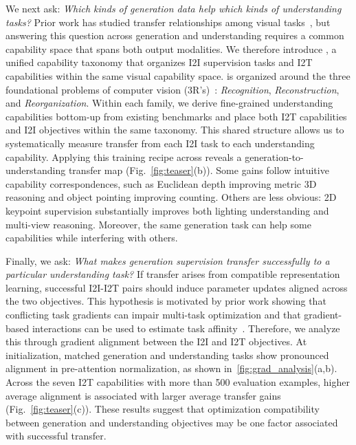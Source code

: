 We next ask: \emph{Which kinds of generation data help which kinds of understanding tasks?}
Prior work has studied transfer relationships among visual tasks~\citep{zamir2018taskonomy},
but answering this question across generation and understanding requires a common capability space that spans both output modalities.
We therefore introduce \methodname, a unified capability taxonomy that organizes I2I supervision tasks and I2T capabilities within the same visual capability space.
\methodname is organized around the three foundational problems of computer vision (3R's)~\citep{malik2016three}: \textit{Recognition}, \textit{Reconstruction}, and \textit{Reorganization}.
Within each family, we derive fine-grained understanding capabilities bottom-up from existing benchmarks and place both I2T capabilities and I2I objectives within the same taxonomy.
This shared structure allows us to systematically measure transfer from each I2I task to each understanding capability.
Applying this training recipe across \methodname reveals a generation-to-understanding transfer map (Fig.~\ref{fig:teaser}(b)).
Some gains follow intuitive capability correspondences, such as Euclidean depth improving metric 3D reasoning and object pointing improving counting.
Others are less obvious: 2D keypoint supervision substantially improves both lighting understanding and multi-view reasoning.
Moreover, the same generation task can help some capabilities while interfering with others.

Finally, we ask: \emph{What makes generation supervision transfer successfully to a particular understanding task?}
If transfer arises from compatible representation learning, successful
I2I-I2T pairs should induce parameter updates aligned across the two objectives.
This hypothesis is motivated by prior work showing that conflicting task gradients
can impair multi-task optimization and that gradient-based interactions can be
used to estimate task affinity~\citep{yu2020gradient,fifty2021efficient}.
Therefore, we analyze this through gradient alignment between the I2I and I2T objectives.
At initialization, matched generation and understanding tasks show pronounced alignment in pre-attention normalization, as shown in~\autoref{fig:grad_analysis}(a,b). Across the seven I2T capabilities with more than 500 evaluation examples, higher average alignment is associated with larger average transfer gains (Fig.~\ref{fig:teaser}(c)).
These results suggest that optimization compatibility between generation and understanding objectives may be one factor associated with successful transfer.

